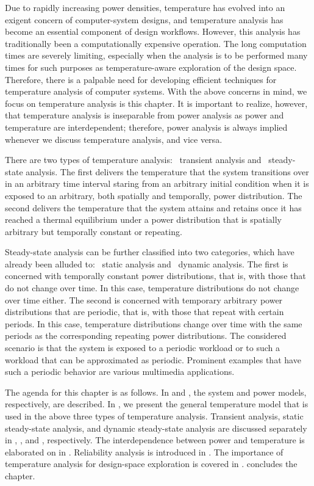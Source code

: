 Due to rapidly increasing power densities, temperature has evolved into an
exigent concern of computer-system designs, and temperature analysis has become
an essential component of design workflows. However, this analysis has
traditionally been a computationally expensive operation. The long computation
times are severely limiting, especially when the analysis is to be performed
many times for such purposes as temperature-aware exploration of the design
space. Therefore, there is a palpable need for developing efficient techniques
for temperature analysis of computer systems. With the above concerns in mind,
we focus on temperature analysis is this chapter. It is important to realize,
however, that temperature analysis is inseparable from power analysis as power
and temperature are interdependent; therefore, power analysis is always implied
whenever we discuss temperature analysis, and vice versa.

There are two types of temperature analysis: \one~transient analysis and
\two~steady-state analysis. The first delivers the temperature that the system
transitions over in an arbitrary time interval staring from an arbitrary initial
condition when it is exposed to an arbitrary, both spatially and temporally,
power distribution. The second delivers the temperature that the system attains
and retains once it has reached a thermal equilibrium under a power distribution
that is spatially arbitrary but temporally constant or repeating.

Steady-state analysis can be further classified into two categories, which have
already been alluded to: \one~static analysis and \two~dynamic analysis. The
first is concerned with temporally constant power distributions, that is, with
those that do not change over time. In this case, temperature distributions do
not change over time either. The second is concerned with temporary arbitrary
power distributions that are periodic, that is, with those that repeat with
certain periods. In this case, temperature distributions change over time with
the same periods as the corresponding repeating power distributions. The
considered scenario is that the system is exposed to a periodic workload or to
such a workload that can be approximated as periodic. Prominent examples that
have such a periodic behavior are various multimedia applications.

The agenda for this chapter is as follows. In  and
, the system and power models, respectively, are described. In
, we present the general temperature model that is used
in the above three types of temperature analysis. Transient analysis, static
steady-state analysis, and dynamic steady-state analysis are discussed
separately in , ,
and , respectively. The interdependence
between power and temperature is elaborated on in
. Reliability analysis is introduced in
. The importance of temperature analysis for
design-space exploration is covered in .
 concludes the chapter.
